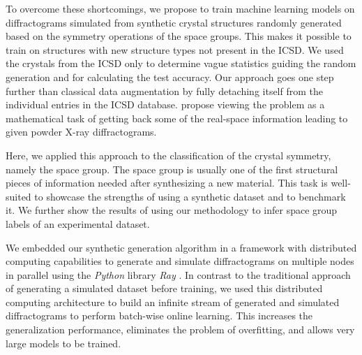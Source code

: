 To overcome these shortcomings, we propose to train machine learning models on
diffractograms simulated from synthetic crystal structures randomly generated
based on the symmetry operations of the space groups. This makes it possible to
train on structures with new structure types not present in the ICSD. We used
the crystals from the ICSD only to determine vague statistics guiding the random
generation and for calculating the test accuracy. Our approach goes one step
further than classical data augmentation by fully detaching itself from the
individual entries in the ICSD database.
  propose viewing the problem
 as a mathematical task of getting back some of the real-space information
leading to given powder X-ray diffractograms. 

Here, we applied this approach to the classification of the crystal symmetry,
namely the space group. The space group is usually one of the first structural
pieces of information needed after synthesizing a new material. This task is
well-suited to showcase the strengths of using a synthetic dataset and to
benchmark it. We further show the results of using our methodology to infer space group labels of an experimental dataset.

We embedded our synthetic generation algorithm in a framework with
distributed computing capabilities to generate and simulate diffractograms on
multiple nodes in parallel using the \emph{Python} library \emph{Ray}
\supercite{moritzRayDistributedFramework2018a}. In contrast to the traditional
approach of generating a simulated dataset before training, we used this
distributed computing architecture to build an infinite stream of 
generated and simulated diffractograms to perform batch-wise online learning.
This increases the generalization performance, eliminates the problem of
overfitting, and allows very large models to be trained.